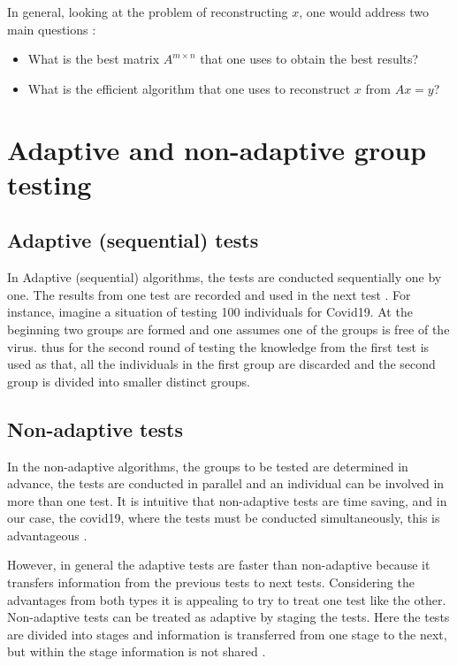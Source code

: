 In general, looking at the problem of reconstructing  $ x $, one would address two main questions \cite{mathbook}: 

\begin{itemize}
	\item What is the best matrix $ A^{m\times n} $   \quad that one uses to obtain the best results? 
	\item What is the efficient algorithm that one uses to reconstruct $ x $ from $ Ax = y $?   
\end{itemize}   
\section{Adaptive and non-adaptive group testing}
\subsection{Adaptive (sequential) tests}
In Adaptive (sequential) algorithms, the tests are conducted sequentially one by one. The results from one test are recorded and used in the next test \cite{kubook}. For instance, imagine a situation of testing 100 individuals for Covid19. At the beginning two groups are formed and one assumes one of the groups is free of the virus. thus for the second round of testing the knowledge from the first test is used as that, all the individuals in the first group are discarded and the second group is divided into smaller distinct groups. 
\subsection{Non-adaptive tests}
In the non-adaptive algorithms, the groups to be tested are determined in advance, the tests are conducted in parallel and an individual can be involved in more than one test. It is intuitive that non-adaptive tests are time saving, and in our case, the covid19, where the tests must be conducted simultaneously, this is advantageous \cite{aldridge}. 

However, in general the adaptive tests are faster than non-adaptive because it transfers information from the previous tests to next tests. Considering the advantages from both types it is appealing to try to treat one test like the other. Non-adaptive tests can be treated as adaptive by staging the tests. Here the tests are divided into stages and information is transferred from one stage to the next, but within the stage information is not shared \cite{kubook}.



